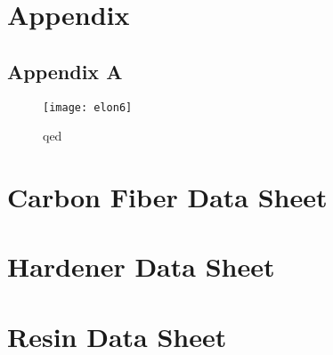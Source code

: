 \begin{appendices}
\chapter{Appendix}
\section{Appendix A}
\begin{figure}
  \texttt{[image: elon6]}
  \caption{qed}
  \label{qed}
\end{figure}

\chapter{Carbon Fiber Data Sheet}
\label{app:carbonfiberdatasheet}
\chapter{Hardener Data Sheet}
\label{app:hardener}
\chapter{Resin Data Sheet}
\label{app:resin}
\end{appendices}
